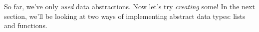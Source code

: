So far, we've only \textit{used} data abstractions. Now let's try
\textit{creating} some!  In the next section, we'll be looking at two ways of
implementing abstract data types: lists and functions.
